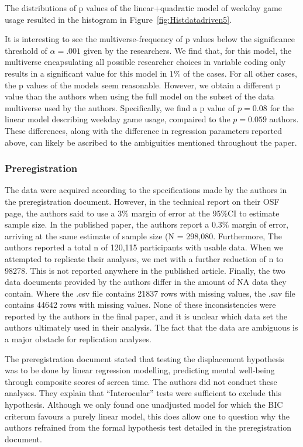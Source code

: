 \documentclass[floatsintext,man]{apa6}
\theoremstyle{definition}
\theoremstyle{definition}
\theoremstyle{definition}
\theoremstyle{remark}
\begin{document}
The distributions of p values of the linear+quadratic model of weekday
game usage resulted in the histogram in
Figure~\ref{fig:Histdatadriven5}.

It is interesting to see the multiverse-frequency of p values below the
significance threshold of \(\alpha = .001\) given by the researchers. We
find that, for this model, the multiverse encapsulating all possible
researcher choices in variable coding only results in a significant
value for this model in \(1\%\) of the cases. For all other cases, the p
values of the models seem reasonable. However, we obtain a different p
value than the authors when using the full model on the subset of the
data multiverse used by the authors. Specifically, we find a p value of
\(p = 0.08\) for the linear model describing weekday game usage,
compaired to the \(p = 0.059\) authors. These differences, along with
the difference in regression parameters reported above, can likely be
ascribed to the ambiguities mentioned throughout the paper.

\hypertarget{preregistration}{%
\subsubsection{Preregistration}\label{preregistration}}

The data were acquired according to the specifications made by the
authors in the preregistration document. However, in the technical
report on their OSF page, the authors said to use a 3\% margin of error
at the 95\%CI to estimate sample size. In the published paper, the
authors report a 0.3\% margin of error, arriving at the same estimate of
sample size (N = 298,080. Furthermore, The authors reported a total n of
120,115 participants with usable data. When we attempted to replicate
their analyses, we met with a further reduction of n to 98278. This is
not reported anywhere in the published article. Finally, the two data
documents provided by the authors differ in the amount of NA data they
contain. Where the .csv file contains 21837 rows with missing values,
the .sav file contains 44642 rows with missing values. None of these
inconsistencies were reported by the authors in the final paper, and it
is unclear which data set the authors ultimately used in their analysis.
The fact that the data are ambiguous is a major obstacle for replication
analyses.

The preregistration document stated that testing the displacement
hypothesis was to be done by linear regression modelling, predicting
mental well-being through composite scores of screen time. The authors
did not conduct these analyses. They explain that \enquote{Interocular}
tests were sufficient to exclude this hypothesis. Although we only found
one unadjusted model for which the BIC criterum favours a purely linear
model, this does allow one to question why the authors refrained from
the formal hypothesis test detailed in the preregistration document.
\end{document}
